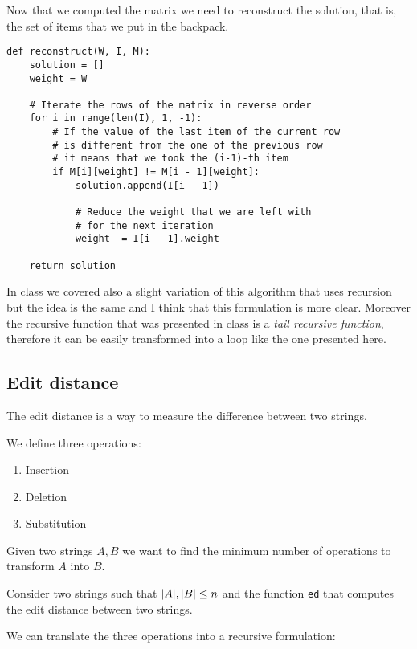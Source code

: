 \documentclass[14pt]{extarticle}
\begin{document}
Now that we computed the matrix we need to reconstruct the solution, that is, the set of items that we put in the backpack.

\begin{verbatim}
def reconstruct(W, I, M):
    solution = []
    weight = W

    # Iterate the rows of the matrix in reverse order
    for i in range(len(I), 1, -1):
        # If the value of the last item of the current row
        # is different from the one of the previous row
        # it means that we took the (i-1)-th item
        if M[i][weight] != M[i - 1][weight]:
            solution.append(I[i - 1])

            # Reduce the weight that we are left with
            # for the next iteration
            weight -= I[i - 1].weight
    
    return solution
\end{verbatim}


\begin{remark}
    In class we covered also a slight variation of this algorithm that uses recursion but the idea is the same and I think that this formulation is more clear.
    Moreover the recursive function that was presented in class is a \emph{tail recursive function}, therefore it can be easily transformed into a loop like the one presented here.
\end{remark}

\subsection{Edit distance}

The edit distance is a way to measure the difference between two strings.

We define three operations:
\begin{enumerate}
    \item Insertion
    \item Deletion
    \item Substitution
\end{enumerate}

Given two strings $A, B$ we want to find the minimum number of operations to transform $A$ into $B$.

Consider two strings such that $\abs{A}, \abs{B} \leq n$ and the function \texttt{ed} that computes the edit distance between two strings.

We can translate the three operations into a recursive formulation:
\end{document}
